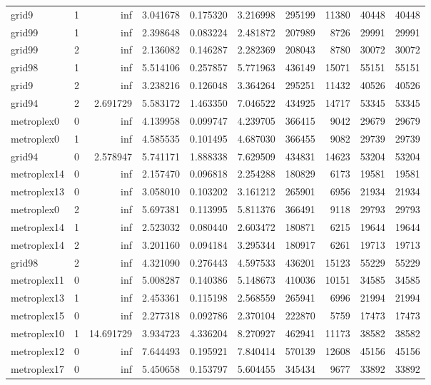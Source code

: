 \begin{longtable}{|l|r|r|r|r|r|r|r|r|r|}
grid9 & 1 & inf & 3.041678 & 0.175320 & 3.216998 & 295199 & 11380 & 40448 & 40448 \\
grid99 & 1 & inf & 2.398648 & 0.083224 & 2.481872 & 207989 & 8726 & 29991 & 29991 \\
grid99 & 2 & inf & 2.136082 & 0.146287 & 2.282369 & 208043 & 8780 & 30072 & 30072 \\
grid98 & 1 & inf & 5.514106 & 0.257857 & 5.771963 & 436149 & 15071 & 55151 & 55151 \\
grid9 & 2 & inf & 3.238216 & 0.126048 & 3.364264 & 295251 & 11432 & 40526 & 40526 \\
grid94 & 2 & 2.691729 & 5.583172 & 1.463350 & 7.046522 & 434925 & 14717 & 53345 & 53345 \\
metroplex0 & 0 & inf & 4.139958 & 0.099747 & 4.239705 & 366415 & 9042 & 29679 & 29679 \\
metroplex0 & 1 & inf & 4.585535 & 0.101495 & 4.687030 & 366455 & 9082 & 29739 & 29739 \\
grid94 & 0 & 2.578947 & 5.741171 & 1.888338 & 7.629509 & 434831 & 14623 & 53204 & 53204 \\
metroplex14 & 0 & inf & 2.157470 & 0.096818 & 2.254288 & 180829 & 6173 & 19581 & 19581 \\
metroplex13 & 0 & inf & 3.058010 & 0.103202 & 3.161212 & 265901 & 6956 & 21934 & 21934 \\
metroplex0 & 2 & inf & 5.697381 & 0.113995 & 5.811376 & 366491 & 9118 & 29793 & 29793 \\
metroplex14 & 1 & inf & 2.523032 & 0.080440 & 2.603472 & 180871 & 6215 & 19644 & 19644 \\
metroplex14 & 2 & inf & 3.201160 & 0.094184 & 3.295344 & 180917 & 6261 & 19713 & 19713 \\
grid98 & 2 & inf & 4.321090 & 0.276443 & 4.597533 & 436201 & 15123 & 55229 & 55229 \\
metroplex11 & 0 & inf & 5.008287 & 0.140386 & 5.148673 & 410036 & 10151 & 34585 & 34585 \\
metroplex13 & 1 & inf & 2.453361 & 0.115198 & 2.568559 & 265941 & 6996 & 21994 & 21994 \\
metroplex15 & 0 & inf & 2.277318 & 0.092786 & 2.370104 & 222870 & 5759 & 17473 & 17473 \\
metroplex10 & 1 & 14.691729 & 3.934723 & 4.336204 & 8.270927 & 462941 & 11173 & 38582 & 38582 \\
metroplex12 & 0 & inf & 7.644493 & 0.195921 & 7.840414 & 570139 & 12608 & 45156 & 45156 \\
metroplex17 & 0 & inf & 5.450658 & 0.153797 & 5.604455 & 345434 & 9677 & 33892 & 33892 \\

\end{longtable}
